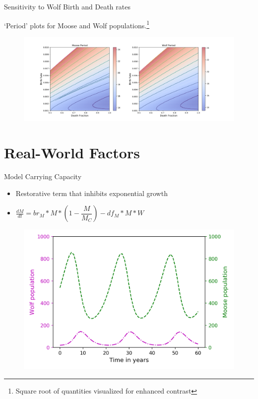 \documentclass{beamer}
\begin{document}
\begin{frame}{Sensitivity to Wolf Birth and Death rates}
	\item `Period' plots for Moose and Wolf populations.\footnote{Square root of quantities visualized for enhanced contrast}
	\begin{figure}
		\vspace*{-0.25cm}\hspace*{-1.1cm}\includegraphics[scale=0.35]{../plot_notebooks/sqrt_per_vary_W}
	\end{figure}
\end{frame}


\section{Real-World Factors}
\begin{frame}{Model Carrying Capacity}
	\begin{itemize}
		\item Restorative term that inhibits exponential growth
	\item
$\frac{dM}{dt}=br_{M}*M*(1-\dfrac{M}{M_{C}})-df_{M}*M*W  $
	\end{itemize}
	\begin{figure}
	\includegraphics[scale=0.45]{../plot_notebooks/long_run_cap}
	\end{figure}

\end{frame}
\end{document}
